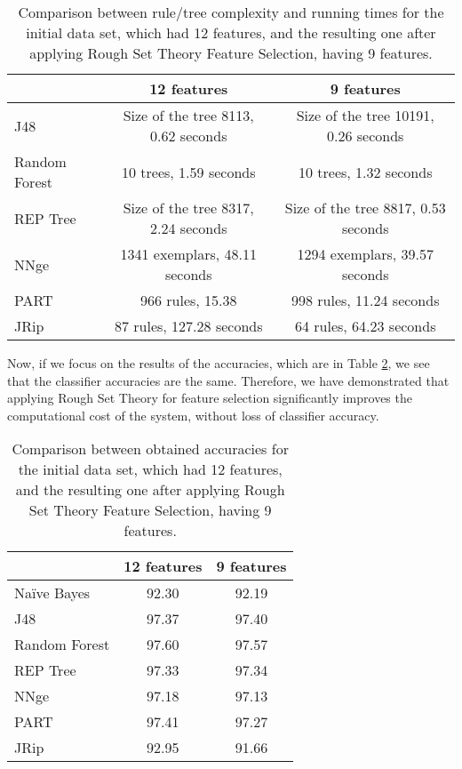 \documentclass{llncs}
\begin{document}
\begin{table}[htpb]
\centering
 \caption{\label{tab_runningtimes} Comparison between rule/tree complexity and running times for the initial data set, which had 12 features, and the resulting one after applying Rough Set Theory Feature Selection, having 9 features.}
{\small
\begin{tabular}{|l|c|c|}
\cline{2-3}
\multicolumn{1}{l|}{} & 12 features & 9 features \\ 
\hline
J48 & Size of the tree 8113, 0.62 seconds & Size of the tree 10191, 0.26 seconds \\ 
\cline{1-1}
Random Forest & 10 trees, 1.59 seconds & 10 trees, 1.32 seconds \\
\cline{1-1}
REP Tree & Size of the tree 8317, 2.24 seconds & Size of the tree 8817, 0.53 seconds \\ 
\cline{1-1}
NNge & 1341 exemplars, 48.11 seconds & 1294 exemplars, 39.57 seconds \\ 
\cline{1-1}
PART & 966 rules, 15.38 & 998 rules, 11.24 seconds \\ 
\cline{1-1}
JRip & 87 rules, 127.28 seconds & 64 rules, 64.23 seconds \\ 
\hline
\end{tabular}
}
\end{table}

Now, if we focus on the results of the accuracies, which are in Table \ref{tab_12featvs9feat}, we see that the classifier accuracies are the same. Therefore, we have demonstrated that applying Rough Set Theory for feature selection significantly improves the computational cost of the system, without loss of classifier accuracy.

\begin{table}[htpb]
\centering
 \caption{\label{tab_12featvs9feat} Comparison between obtained accuracies for the initial data set, which had 12 features, and the resulting one after applying Rough Set Theory Feature Selection, having 9 features.}
{\small
\begin{tabular}{|l|c|c|}
\cline{2-3}
\multicolumn{1}{l|}{} & 12 features & 9 features \\ 
\hline
Na\"ive Bayes & 92.30 & 92.19 \\ 
\cline{1-1}
J48 & 97.37 & 97.40 \\ 
\cline{1-1}
Random Forest & 97.60 & 97.57 \\
\cline{1-1}
REP Tree & 97.33 & 97.34 \\ 
\cline{1-1}
NNge & 97.18 & 97.13 \\ 
\cline{1-1}
PART & 97.41 & 97.27 \\ 
\cline{1-1}
JRip & 92.95 & 91.66 \\ 
\hline
\end{tabular}
}
\end{table}
\end{document}
